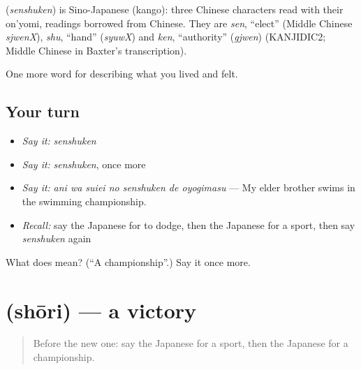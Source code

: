 \begin{cousinweb}
\textbf{} (\emph{senshuken}) is Sino-Japanese (kango): three Chinese characters read with their on'yomi, readings borrowed from Chinese. They are \emph{sen}, \textquotedblleft{}elect\textquotedblright{} (Middle Chinese \emph{sjwenX}), \emph{shu}, \textquotedblleft{}hand\textquotedblright{} (\emph{syuwX}) and \emph{ken}, \textquotedblleft{}authority\textquotedblright{} (\emph{gjwen}) (KANJIDIC2; Middle Chinese in Baxter's transcription).
\end{cousinweb}

\begin{grammarlens}[title={What you've built}]
One more word for describing what you lived and felt.
\end{grammarlens}

\subsection*{Your turn}
\begin{itemize}
\raggedright
  \item \emph{Say it:} \emph{senshuken}
  \item \emph{Say it:} \emph{senshuken}, once more
  \item \emph{Say it:} \emph{ani wa suiei no senshuken de oyogimasu} — My elder brother swims in the swimming championship.
  \item \emph{Recall:} say the Japanese for to dodge, then the Japanese for a sport, then say \emph{senshuken} again
\end{itemize}

\begin{tcolorbox}[breakable,colback=teal!4,colframe=teal!35!black,title={Before you move on}]
What does  mean? (\textquotedblleft{}A championship\textquotedblright{}.) Say it once more.
\end{tcolorbox}
\section[\texorpdfstring{\ja{しょうり} (shōri)}{しょうり (shōri)}]{ (shōri) — a victory}

\label{lesson:JA-C506-shouri}



\begin{quote}
Before the new one: say the Japanese for a sport, then the Japanese for a championship.
\end{quote}


